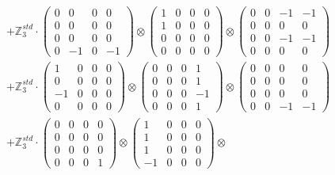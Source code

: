 \documentclass{article}
\begin{document}
{\begin{align}
        &+ \label{Rs1-Rc16-Solution-3-c4} \mathbb{Z}_3^{std} \cdot 
            \begin{pmatrix} 0 & 0 & 0 & 0 \\ 0 & 0 & 0 & 0 \\ 0 & 0 & 0 & 0 \\ 0 & -1 & 0 & -1 \end{pmatrix} \otimes 
            \begin{pmatrix} 1 & 0 & 0 & 0 \\ 1 & 0 & 0 & 0 \\ 0 & 0 & 0 & 0 \\ 0 & 0 & 0 & 0 \end{pmatrix} \otimes 
            \begin{pmatrix} 0 & 0 & -1 & -1 \\ 0 & 0 & 0 & 0 \\ 0 & 0 & -1 & -1 \\ 0 & 0 & 0 & 0 \end{pmatrix} \\ 
        &+ \label{Rs1-Rc16-Solution-3-c5} \mathbb{Z}_3^{std} \cdot 
            \begin{pmatrix} 1 & 0 & 0 & 0 \\ 0 & 0 & 0 & 0 \\ -1 & 0 & 0 & 0 \\ 0 & 0 & 0 & 0 \end{pmatrix} \otimes 
            \begin{pmatrix} 0 & 0 & 0 & 1 \\ 0 & 0 & 0 & 1 \\ 0 & 0 & 0 & -1 \\ 0 & 0 & 0 & 1 \end{pmatrix} \otimes 
            \begin{pmatrix} 0 & 0 & 0 & 0 \\ 0 & 0 & 0 & 0 \\ 0 & 0 & 0 & 0 \\ 0 & 0 & -1 & -1 \end{pmatrix} \\ 
        &+ \label{Rs1-Rc16-Solution-3-c6} \mathbb{Z}_3^{std} \cdot 
            \begin{pmatrix} 0 & 0 & 0 & 0 \\ 0 & 0 & 0 & 0 \\ 0 & 0 & 0 & 0 \\ 0 & 0 & 0 & 1 \end{pmatrix} \otimes 
            \begin{pmatrix} 1 & 0 & 0 & 0 \\ 1 & 0 & 0 & 0 \\ 1 & 0 & 0 & 0 \\ -1 & 0 & 0 & 0 \end{pmatrix} \otimes 

\end{align}}
\end{document}
